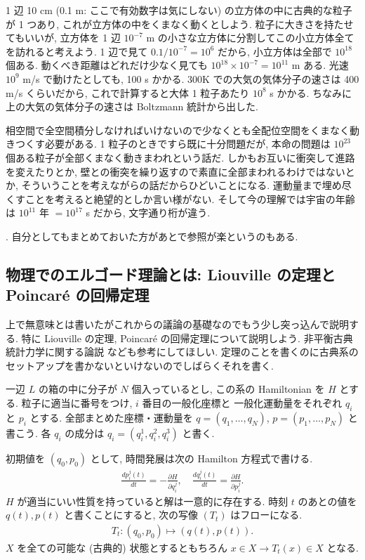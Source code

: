 \documentclass[openany, a4paper, oneside]{jsbook}
\begin{document}
{1 辺 10 cm (0.1 m: ここで有効数字は気にしない) の立方体の中に古典的な粒子が 1 つあり,
これが立方体の中をくまなく動くとしよう.
粒子に大きさを持たせてもいいが, 立方体を 1 辺 $10^{-7}$ m
の小さな立方体に分割してこの小立方体全てを訪れると考えよう.
1 辺で見て $0.1 / 10^{-7} = 10^6$ だから,
小立方体は全部で $10^{18}$ 個ある.
動くべき距離はどれだけ少なく見ても $10^{18} \times 10^{-7} = 10^{11}$ m ある.
光速 $10^{9}$ m/s で動けたとしても, 100 s かかる.
300K での大気の気体分子の速さは 400 m/s くらいだから,
これで計算すると大体 1 粒子あたり $10^{8}$ s かかる.
ちなみに上の大気の気体分子の速さは Boltzmann 統計から出した.

相空間で全空間積分しなければいけないので少なくとも全配位空間をくまなく動きつくす必要がある.
1 粒子のときですら既に十分問題だが,
本命の問題は $10^{23}$ 個ある粒子が全部くまなく動きまわれという話だ.
しかもお互いに衝突して進路を変えたりとか,
壁との衝突を繰り返すので素直に全部まわれるわけではないとか,
そういうことを考えながらの話だからひどいことになる.
運動量まで埋め尽くすことを考えると絶望的としか言い様がない.
そして今の理解では宇宙の年齢は $10^{11}$ 年 $= 10^{17}$ s だから, 文字通り桁が違う.}.
自分としてもまとめておいた方があとで参照が楽というのもある.
\subsection{物理でのエルゴード理論とは: Liouville の定理と Poincar\'e の回帰定理}

上で無意味とは書いたがこれからの議論の基礎なのでもう少し突っ込んで説明する.
特に Liouville の定理, Poincar\'e の回帰定理について説明しよう.
非平衡古典統計力学に関する論説 \cite{ShuichiTasaki1} なども参考にしてほしい.
定理のことを書くのに古典系のセットアップを書かないといけないのでしばらくそれを書く.

一辺 $L$ の箱の中に分子が $N$ 個入っているとし,
この系の Hamiltonian を $H$ とする.
粒子に適当に番号をつけ, $i$ 番目の一般化座標と
一般化運動量をそれぞれ $q_i$ と $p_i$ とする.
全部まとめた座標・運動量を $q = (q_1, \dots, q_N)$,
$p = (p_1, \dots, p_N)$ と書こう.
各 $q_i$ の成分は $q_i = (q_i^1, q_i^2, q_i^3)$ と書く.

初期値を $(q_0, p_0)$ として,
時間発展は次の Hamilton 方程式で書ける.
\begin{align}
 \frac{d p_{i}^j (t)}{dt}
 =
 -\frac{\partial H}{\partial q_i^j}, \quad
 \frac{d q_{i}^j (t)}{dt}
 =
 \frac{\partial H}{\partial p_i^j}.
\end{align}
$H$ が適当にいい性質を持っていると解は一意的に存在する.
時刻 $t$ のあとの値を $q(t), p(t)$ と書くことにすると,
次の写像 $(T_t)$ はフローになる.
\begin{align}
 T_t \colon
 (q_0, p_0) \mapsto (q(t), p(t)).
\end{align}
$X$ を全ての可能な (古典的) 状態とするともちろん $x \in X \to T_t (x) \in X$ となる.
\end{document}
